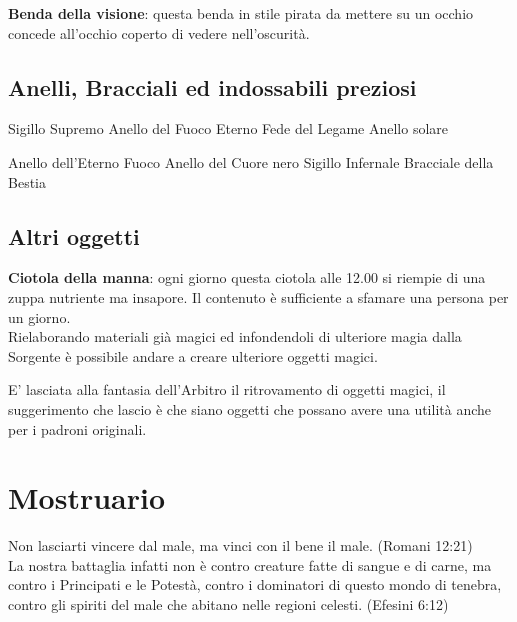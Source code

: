 \documentclass[12pt,a4paper,twoside,openany]{book}
\begin{document}
\begin{multicols}{2}
\textbf{Benda della visione}: questa benda in stile pirata da mettere su un occhio concede all'occhio coperto di vedere nell'oscurità.

\subsection{Anelli, Bracciali ed indossabili preziosi}
Sigillo Supremo
Anello del Fuoco Eterno
Fede del Legame
Anello solare

Anello dell'Eterno Fuoco
Anello del Cuore nero
Sigillo Infernale
Bracciale della Bestia

\subsection{Altri oggetti}

\textbf{Ciotola della manna}: ogni giorno questa ciotola alle 12.00 si riempie di una zuppa nutriente ma insapore. Il contenuto è sufficiente a sfamare una persona per un giorno.\\

Rielaborando materiali già magici ed infondendoli di ulteriore magia dalla Sorgente è possibile andare a creare ulteriore oggetti magici.

E' lasciata alla fantasia dell'Arbitro il ritrovamento di oggetti magici, il suggerimento che lascio è che siano oggetti che possano avere una utilità anche per i padroni originali.


\end{multicols}

\pagebreak

\section{Mostruario}

\begin{changemargin}{0.3cm}{0.3cm}\begin{enfasi}{
Non lasciarti vincere dal male, ma vinci con il bene il male. (Romani 12:21)\\

La nostra battaglia infatti non è contro creature fatte di sangue e di carne, ma contro i Principati e le Potestà, contro i dominatori di questo mondo di tenebra, contro gli spiriti del male che abitano nelle regioni celesti. (Efesini 6:12)

}\end{enfasi}\end{changemargin}\medskip
\end{document}
